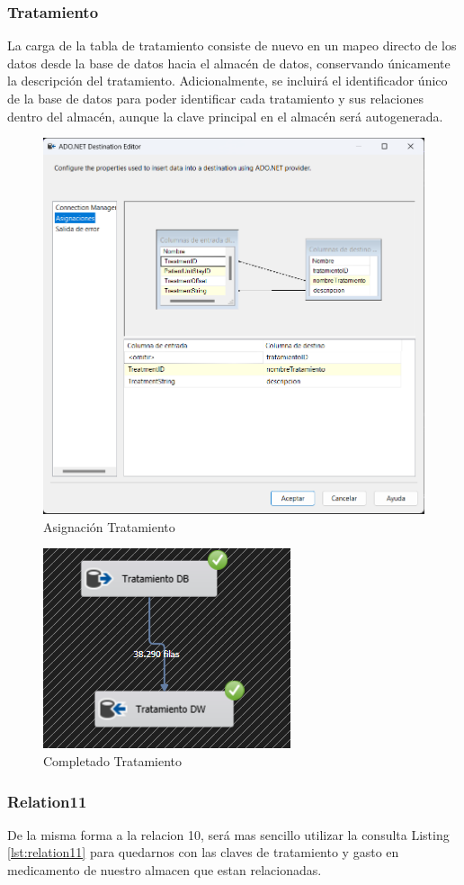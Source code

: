 \documentclass{article}
\begin{document}
	\subsubsection{Tratamiento}
	La carga de la tabla de tratamiento consiste de nuevo en un mapeo directo de los datos desde la base de datos hacia el almacén de datos, conservando únicamente la descripción del tratamiento. Adicionalmente, se incluirá el identificador único de la base de datos para poder identificar cada tratamiento y sus relaciones dentro del almacén, aunque la clave principal en el almacén será autogenerada.
	\begin{figure}[H]
		\centering
		\includegraphics[width=.7\linewidth]{./images/asignaciones/tratamiento.png}
		\caption{Asignación Tratamiento}
	\end{figure}
	\begin{figure}[H]
		\centering
		\includegraphics[width=.3\linewidth]{./images/completados/tratamiento.png}
		\caption{Completado Tratamiento}
	\end{figure}
	\subsubsection{Relation11}
	De la misma forma a la relacion 10, será mas sencillo utilizar la consulta Listing \ref{lst:relation11} para quedarnos con las claves de tratamiento y gasto en medicamento de nuestro almacen que estan relacionadas.
	
\end{document}
